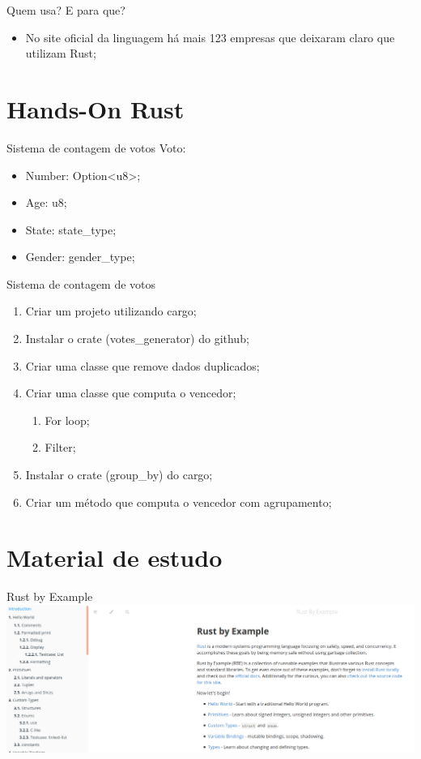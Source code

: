 \documentclass[aspectratio=169]{beamer}
\begin{document}
\begin{frame}{Quem usa? E para que?}
	\begin{itemize}
		\item No site oficial da linguagem há mais 123 empresas que deixaram claro que utilizam Rust;
	\end{itemize}
\end{frame}

\section{Hands-On Rust}

\begin{frame}{Sistema de contagem de votos}
	Voto: 
	\begin{itemize}
		\item Number: Option<u8>;
		\item Age: u8;
		\item State: state\_type;
		\item Gender: gender\_type;
	\end{itemize}
\end{frame}

\begin{frame}{Sistema de contagem de votos}
	\begin{enumerate}
		\item Criar um projeto utilizando cargo;
		\item Instalar o crate (votes\_generator) do github;
		\item Criar uma classe que remove dados duplicados;
		\item Criar uma classe que computa o vencedor;
		\begin{enumerate}
			\item For loop;
			\item Filter;
		\end{enumerate}
		\item Instalar o crate (group\_by) do cargo;
		\item Criar um método que computa o vencedor com agrupamento;
	\end{enumerate}
\end{frame}

\section{Material de estudo}

\begin{frame}{Rust by Example}
	\includegraphics[width=15.0cm]{imgs/rust-by-example.png}	
\end{frame}
\end{document}
